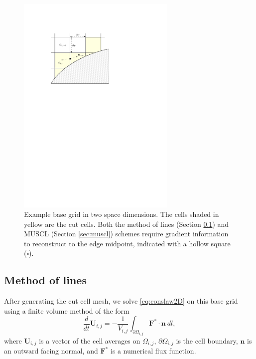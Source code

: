 \begin{figure}
\begin{center}
\includegraphics[width=3.0in]{figs/example_ccmesh.pdf}
\caption{\sf Example base grid in two space dimensions. The cells shaded in yellow are the cut cells.  Both the method of lines (Section \ref{sec:mol}) and MUSCL (Section \ref{sec:muscl}) schemes require gradient information to reconstruct to the edge midpoint, indicated with a hollow square ($\square$).} 
\label{fig:2dfig}
\end{center}
\end{figure}




\subsection{Method of lines} \label{sec:mol}

After generating the cut cell mesh, we solve \eqref{eq:conslaw2D} on this base grid using a finite volume method of the form
\begin{equation}\label{eq:fvscheme}
\frac{d}{dt}\mathbf{U}_{i,j} =- \frac{1}{V_{i,j}} \int_{\partial \Omega_{i,j}} \mathbf{F}^* \cdot \mathbf{n} ~dl,
\end{equation}
where $\mathbf{U}_{i,j}$ is a vector of the cell averages on $\Omega_{i,j}$, $\partial \Omega_{i,j}$ is the cell boundary, $\mathbf{n}$ is an outward facing normal, and $\mathbf{F}^*$ is a numerical flux function.

